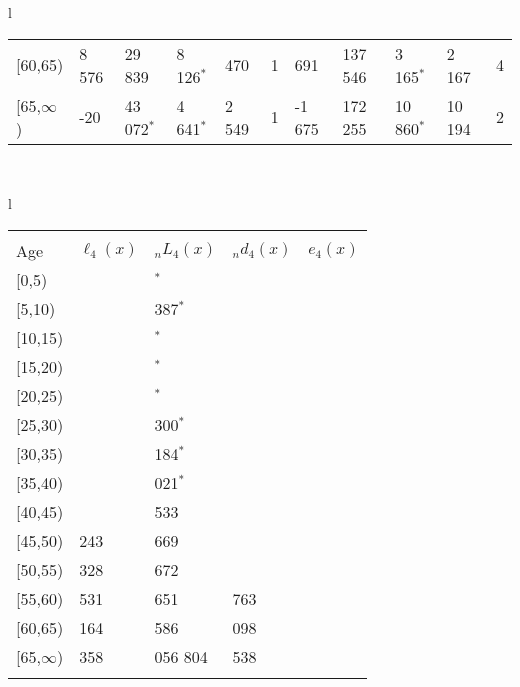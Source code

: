 \documentclass[
]{article}
\begin{document}
\begin{table}
\begin{tabular}[t]{l}
\begin{tabular}
{}[60,65) & 8 576 & 29 839 & 8 126$^{*}$ & 470 & 1 & 691 & 137 546 & 3 165$^{*}$ & 2 167 & 4\\
{}[65,$\infty$) & -20 & 43 072$^{*}$ & 4 641$^{*}$ & 2 549 & 1 & -1 675 & 172 255 & 10 860$^{*}$ & 10 194 & 2\\
\end{tabular}\\
\end{tabular}
\centering
\begin{tabular}[t]{l}
\hline
\begin{tabular}{>{\raggedright\arraybackslash}p{.43in}>{\raggedleft\arraybackslash}p{1.3in}>{\raggedleft\arraybackslash}p{1.3in}>{\raggedleft\arraybackslash}p{1.3in}>{\raggedleft\arraybackslash}p{1.3in}}
\toprule
\multicolumn{1}{c}{ } & \multicolumn{4}{c}{(4) Lost both} \\
\cmidrule(l{3pt}r{3pt}){2-5}
Age & $\ell_{4}(x)$ & ${}_nL_{4}(x)$ & ${}_nd_{4}(x)$ & $e_{4}(x)$\\
\midrule
{}[0,5) & 0 & 0$^{*}$ & 0 & 16\\
{}[5,10) & 0 & 2 387$^{*}$ & 0 & 16\\
{}[10,15) & 0 & 922$^{*}$ & 0 & 16\\
{}[15,20) & 0 & 0$^{*}$ & 0 & 16\\
{}[20,25) & 0 & 0$^{*}$ & 0 & 16\\
\addlinespace
{}[25,30) & 0 & 2 300$^{*}$ & 4 & 17\\
{}[30,35) & -5 & 5 184$^{*}$ & 11 & 17\\
{}[35,40) & -15 & 11 021$^{*}$ & 28 & 17\\
{}[40,45) & -44 & 23 533 & 77 & 17\\
{}[45,50) & 2 243 & 60 669 & 276 & 17\\
\addlinespace
{}[50,55) & 12 328 & 103 672 & 705 & 17\\
{}[55,60) & 16 531 & 164 651 & 1 763 & 16\\
{}[60,65) & 24 164 & 196 586 & 3 098 & 15\\
{}[65,$\infty$) & 32 358 & 1 056 804 & 62 538 & 14\\
\bottomrule
\multicolumn{5}{l}{\rule{0pt}{1em}\textsuperscript{*} Based on an estimated from SIPP with less than 10 respondents in the numerator.}\\
\end{tabular}\\
\end{tabular}
\end{table}
\end{document}
